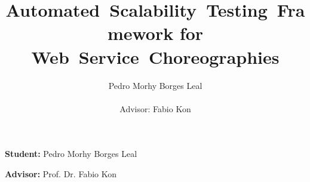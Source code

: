 \documentclass[11pt,a4paper]{article} %
\title{Automated~Scalability~Testing~Framework for Web~Service~Choreographies}
\author{Pedro Morhy Borges Leal\\\\Advisor: Fabio Kon}
\begin{document}
\maketitle

\newpage

\tableofcontents
\newpage
\textbf{Student:} Pedro Morhy Borges Leal

\textbf{Advisor:} Prof. Dr. Fabio Kon



\newpage

\newpage

\newpage

\newpage

\newpage


 
\end{document}
